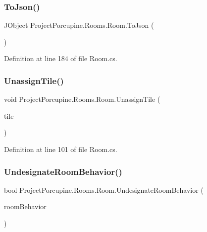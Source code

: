 \subsubsection{\texorpdfstring{To\+Json()}{ToJson()}}
{\footnotesize\ttfamily J\+Object Project\+Porcupine.\+Rooms.\+Room.\+To\+Json (\begin{DoxyParamCaption}{ }\end{DoxyParamCaption})}



Definition at line 184 of file Room.\+cs.

\mbox{\label{class_project_porcupine_1_1_rooms_1_1_room_a40bf24f1f70ac7ab4e8d19b4d1c65051}} 
\subsubsection{\texorpdfstring{Unassign\+Tile()}{UnassignTile()}}
{\footnotesize\ttfamily void Project\+Porcupine.\+Rooms.\+Room.\+Unassign\+Tile (\begin{DoxyParamCaption}\item[{\hyperlink{class_tile}{Tile}}]{tile }\end{DoxyParamCaption})}



Definition at line 101 of file Room.\+cs.

\mbox{\label{class_project_porcupine_1_1_rooms_1_1_room_a0f765875c3588dfd4998d1b0ab13da86}} 
\subsubsection{\texorpdfstring{Undesignate\+Room\+Behavior()}{UndesignateRoomBehavior()}}
{\footnotesize\ttfamily bool Project\+Porcupine.\+Rooms.\+Room.\+Undesignate\+Room\+Behavior (\begin{DoxyParamCaption}\item[{\hyperlink{class_project_porcupine_1_1_rooms_1_1_room_behavior}{Room\+Behavior}}]{room\+Behavior }\end{DoxyParamCaption})}



